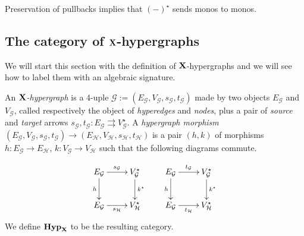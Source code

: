 \documentclass[runningheads,envcountsect]{llncs}
\def\X{\textbf {\textup{X}}}
\newcommand{\catname}[1]{\textbf{\textup{#1}}}
\newcommand{\hyp}{\catname{Hyp}}
\begin{document}
\begin{remark}\label{rem:mono}
	Preservation of pullbacks implies that $(-)^\star$ sends monos to monos.
\end{remark}


\subsection{The category of $\X$-hypergraphs}


We will start this section with the definition of $\X$-hypergraphs and we will see how to label them with an algebraic signature. 


\begin{definition}An \emph{$\X$-hypergraph} is a 4-uple $\mathcal{G}:=(E_\mathcal{G}, V_\mathcal{G}, s_\mathcal{G}, t_\mathcal{G})$ made by two objects $E_\mathcal{G}$ and $V_\mathcal{G}$, called respectively the object of \emph{hyperedges} and \emph{nodes}, plus a pair of \emph{source} and \emph{target} arrows  $s_\mathcal{G}, t_\mathcal{G}\colon E_\mathcal{G}\rightrightarrows V_\mathcal{G}^\star$. A \emph{hypergraph morphism} $(E_\mathcal{G}, V_\mathcal{G}, s_\mathcal{G}, t_\mathcal{G})\to (E_\mathcal{H}, V_\mathcal{H}, s_\mathcal{H}, t_\mathcal{H})$ is a pair $(h,k)$ of morphisms $h\colon E_\mathcal{G}\to E_\mathcal{H}$, $k\colon V_\mathcal{G}\to V_\mathcal{H}$ such that the following diagrams commute.
	
	\[\xymatrix{ E_{\mathcal{G}} \ar[d]_{h} \ar[r]^{s_{\mathcal{G}}}& V^\star_{\mathcal{G}}  \ar[d]^{k^\star}& E_{\mathcal{G}} \ar[r]^{t_{\mathcal{G}}} \ar[d]_{h} & V^\star_{\mathcal{G}} \ar[d]^{k^\star}  \\ E_{\mathcal{G}} \ar[r]_{s_{\mathcal{H}}} & V^\star_{\mathcal{H}} & E_{\mathcal{G}} \ar[r]_{t_{\mathcal{H}}} & V^\star_{\mathcal{H}} }\]
	We define $\hyp_\X$ to be the resulting category.
\end{definition}
\end{document}
